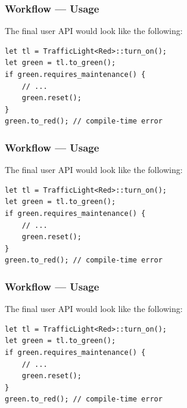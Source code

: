 \documentclass[bigger,notes,aspectratio=169]{beamer}
\begin{document}
\begin{frame}[fragile]
    \frametitle{Workflow --- Usage}
    The final user API would look like the following:
    \begin{listing}
        \centering
        \begin{verbatim}
let tl = TrafficLight<Red>::turn_on();
let green = tl.to_green();
if green.requires_maintenance() {
    // ...
    green.reset();
}
green.to_red(); // compile-time error
        \end{verbatim}
    \end{listing}

\end{frame}

\begin{frame}[fragile]
    \frametitle{Workflow --- Usage}
    The final user API would look like the following:
    \begin{listing}
        \centering
        \begin{verbatim}
let tl = TrafficLight<Red>::turn_on();
let green = tl.to_green();
if green.requires_maintenance() {
    // ...
    green.reset();
}
green.to_red(); // compile-time error
        \end{verbatim}
    \end{listing}

\end{frame}

\begin{frame}[fragile]
    \frametitle{Workflow --- Usage}
    The final user API would look like the following:
    \begin{listing}
        \centering
        \begin{verbatim}
let tl = TrafficLight<Red>::turn_on();
let green = tl.to_green();
if green.requires_maintenance() {
    // ...
    green.reset();
}
green.to_red(); // compile-time error
        \end{verbatim}
    \end{listing}

\end{frame}
\end{document}

